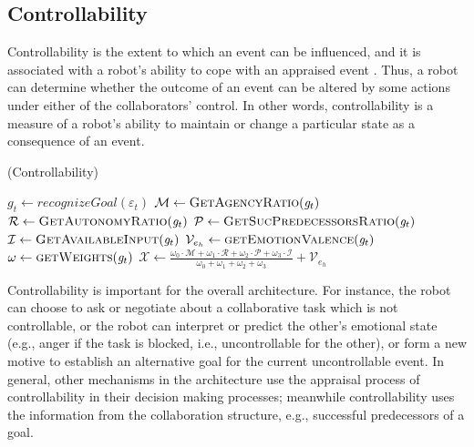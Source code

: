 \documentclass{article}
\begin{document}
\subsection{Controllability}
\label{sec:controllability}

Controllability is the extent to which an event can be influenced, and it is
associated with a robot's ability to cope with an appraised event
\cite{gratch:domain-independent}. Thus, a robot can determine whether the
outcome of an event can be altered by some actions under either of the
collaborators' control. In other words, controllability is a measure of a
robot's ability to maintain or change a particular state as a consequence of an
event.

\begin{algorithm}
	\caption{(Controllability)}
	\label{alg:controllability}
	\begin{algorithmic}[1]
 			\State $\mathit{g}_{t} \gets \textit{recognizeGoal}{(\varepsilon_t)}$
 			\Statex
			\State $\mathcal{M} \gets \Call{GetAgencyRatio}{\mathit{g}_{t}}$ 
			\State $\mathcal{R} \gets \Call{GetAutonomyRatio}{\mathit{g}_{t}}$
			\State $\mathcal{P} \gets \Call{GetSucPredecessorsRatio}{\mathit{g}_{t}}$
			\State $\mathcal{I} \gets \Call{GetAvailableInput}{\mathit{g}_{t}}$
			\State $\mathcal{V}_{e_h} \gets \Call{getEmotionValence}{\mathit{g}_{t}}$ 
			\State $\omega \gets \Call{getWeights}{\mathit{g}_{t}}$
			\Statex
			\State $\mathcal{X} \gets
			\frac{\omega_{0}\cdot \mathcal{M} + \omega_{1}\cdot \mathcal{R} +
			\omega_{2}\cdot \mathcal{P} + \omega_{3}\cdot \mathcal{I}}{\omega_{0} +
			\omega_{1} + \omega_{2} + \omega_{3}} + \mathcal{V}_{e_h}$
  			\Statex
				\State {}
			\Else
				\State {}
			\EndIf
		\EndFunction
	\end{algorithmic}
\end{algorithm}

\vspace*{-3mm}
Controllability is important for the overall architecture. For instance, the
robot can choose to ask or negotiate about a collaborative task which is not
controllable, or the robot can interpret or predict the other's emotional state
(e.g., anger if the task is blocked, i.e., uncontrollable for the other), or
form a new motive to establish an alternative goal for the current
uncontrollable event. In general, other mechanisms in the architecture use the
appraisal process of controllability in their decision making processes;
meanwhile controllability uses the information from the collaboration structure,
e.g., successful predecessors of a goal.
\end{document}
